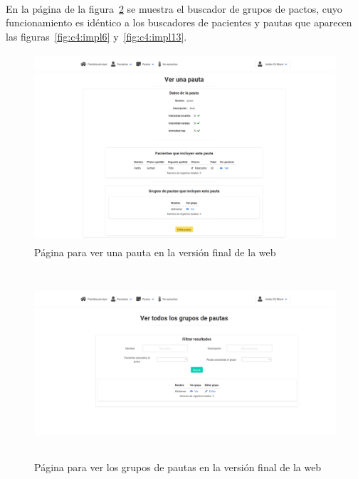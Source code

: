 \paragraph{}
En la página de la figura~\ref{fig:c4:impl15} se muestra el buscador de grupos de pactos, cuyo funcionamiento es idéntico a los buscadores de pacientes y pautas que aparecen las figuras~\ref{fig:c4:impl6} y~\ref{fig:c4:impl13}.

\begin{figure}[H]
    \centering
    \includegraphics[height=7cm, width=\textwidth]{Imagenes/10-verPauta.png}
    \caption[Página para ver una pauta en la versión final de la web]{Página para ver una pauta en la versión final de la web}
    \label{fig:c4:impl14}
\end{figure}

\begin{figure}[H]
    \centering
    \includegraphics[height=7cm, width=\textwidth]{Imagenes/11-verGrupos.png}
    \caption[Página para ver los grupos de pautas en la versión final de la web]{Página para ver los grupos de pautas en la versión final de la web}
    \label{fig:c4:impl15}
\end{figure}

